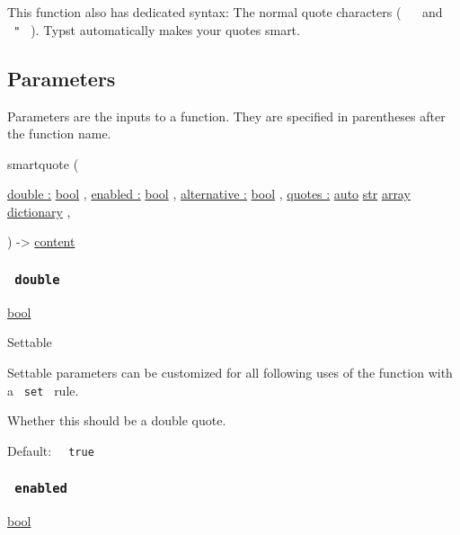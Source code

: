 This function also has dedicated syntax: The normal quote characters (
\texttt{\ \textquotesingle{}\ } and \texttt{\ "\ } ). Typst
automatically makes your quotes smart.

\subsection{\texorpdfstring{{ Parameters
}}{ Parameters }}\label{parameters}

\label{parameters-tooltip}
Parameters are the inputs to a function. They are specified in
parentheses after the function name.

{ smartquote } (

{ \hyperref[parameters-double]{double :}
\href{/docs/reference/foundations/bool/}{bool} , } {
\hyperref[parameters-enabled]{enabled :}
\href{/docs/reference/foundations/bool/}{bool} , } {
\hyperref[parameters-alternative]{alternative :}
\href{/docs/reference/foundations/bool/}{bool} , } {
\hyperref[parameters-quotes]{quotes :}
\href{/docs/reference/foundations/auto/}{auto}
\href{/docs/reference/foundations/str/}{str}
\href{/docs/reference/foundations/array/}{array}
\href{/docs/reference/foundations/dictionary/}{dictionary} , }

) -\textgreater{} \href{/docs/reference/foundations/content/}{content}

\subsubsection{\texorpdfstring{\texttt{\ double\ }}{ double }}\label{parameters-double}

\href{/docs/reference/foundations/bool/}{bool}

{{ Settable }}

\label{parameters-double-settable-tooltip}
Settable parameters can be customized for all following uses of the
function with a \texttt{\ set\ } rule.

Whether this should be a double quote.

Default: \texttt{\ }{\texttt{\ true\ }}\texttt{\ }

\subsubsection{\texorpdfstring{\texttt{\ enabled\ }}{ enabled }}\label{parameters-enabled}

\href{/docs/reference/foundations/bool/}{bool}


